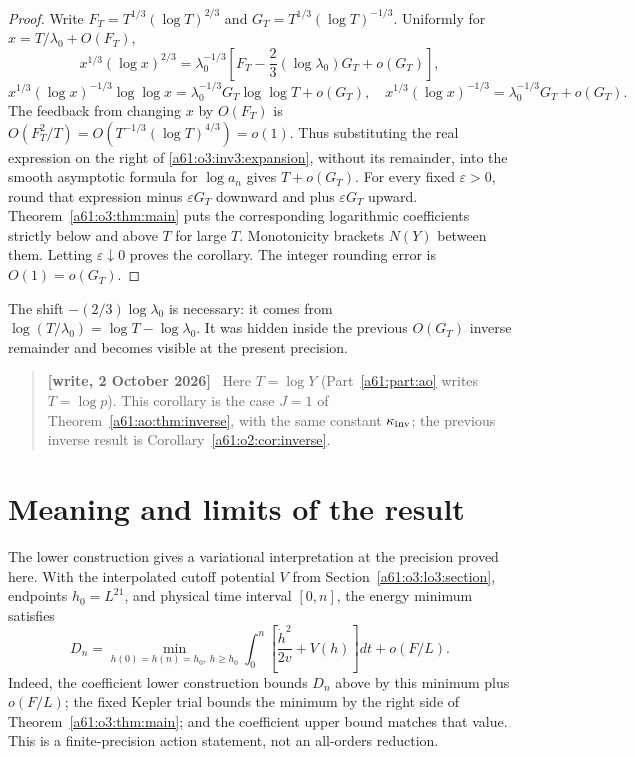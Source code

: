 \documentclass[11pt,letterpaper]{article}
\numberwithin{equation}{section}
\theoremstyle{remark}\newtheorem{remark}[theorem]{Remark}
\newenvironment{writenote}{\par\smallskip\begin{quote}\small\textbf{[write, 2 October 2026]}\ }{\end{quote}\smallskip}
\begin{document}
\begin{proof}
Write $F_T=T^{1/3}(\log T)^{2/3}$ and
$G_T=T^{1/3}(\log T)^{-1/3}$. Uniformly for
$x=T/\lambda_0+O(F_T)$,
\[
 x^{1/3}(\log x)^{2/3}
 =\lambda_0^{-1/3}
       \left[F_T-\frac23(\log\lambda_0)G_T+o(G_T)\right],
\]
\[
 x^{1/3}(\log x)^{-1/3}\log\log x
 =\lambda_0^{-1/3}G_T\log\log T+o(G_T),
 \quad
 x^{1/3}(\log x)^{-1/3}=\lambda_0^{-1/3}G_T+o(G_T).
\]
The feedback from changing $x$ by $O(F_T)$ is
$O(F_T^2/T)=O(T^{-1/3}(\log T)^{4/3})=o(1)$.
Thus substituting the real expression on the right of
\eqref{a61:o3:inv3:expansion}, without its remainder, into the smooth
asymptotic formula for $\log a_n$ gives $T+o(G_T)$.
For every fixed $\varepsilon>0$, round that expression minus
$\varepsilon G_T$ downward and plus $\varepsilon G_T$ upward.
Theorem~\ref{a61:o3:thm:main} puts the corresponding logarithmic coefficients
strictly below and above $T$ for large $T$. Monotonicity brackets
$N(Y)$ between them. Letting $\varepsilon\downarrow0$ proves the
corollary. The integer rounding error is $O(1)=o(G_T)$.
\end{proof}

The shift $-(2/3)\log\lambda_0$ is necessary: it comes from
$\log(T/\lambda_0)=\log T-\log\lambda_0$. It was hidden inside the
previous $O(G_T)$ inverse remainder and becomes visible at the present
precision.
\begin{writenote}
Here $T=\log Y$ (Part~\ref{a61:part:ao} writes $T=\log p$). This corollary is the case $J=1$ of Theorem~\ref{a61:ao:thm:inverse}, with the same constant $\kappa_{\rm inv}$; the previous inverse result is Corollary~\ref{a61:o2:cor:inverse}.
\end{writenote}



\section{Meaning and limits of the result}
The lower construction gives a variational interpretation at the
precision proved here. With the interpolated cutoff potential $V$
from Section~\ref{a61:o3:lo3:section}, endpoints $h_0=L^{21}$, and physical
time interval $[0,n]$, the energy minimum satisfies
\[
 D_n=\min_{h(0)=h(n)=h_0,\ h\ge h_0}
       \int_0^n\left[\frac{\dot h^2}{2v}+V(h)\right]dt
       +o(F/L).
\]
Indeed, the coefficient lower construction bounds $D_n$ above by this
minimum plus $o(F/L)$; the fixed Kepler trial bounds the minimum by
the right side of Theorem~\ref{a61:o3:thm:main}; and the coefficient upper
bound matches that value. This is a finite-precision action statement,
not an all-orders reduction.
\end{document}
